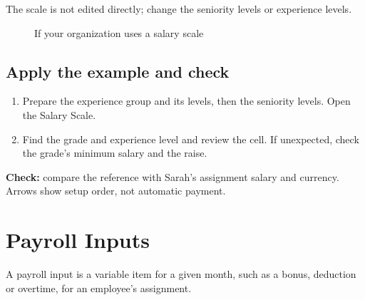 The scale is not edited directly; change the seniority levels or experience levels.

\begin{figure}[H]
\centering
{}
\rclegend
\caption{If your organization uses a salary scale}
\label{fig:hr-scale-setup}
\end{figure}

\subsection{Apply the example and check}

\begin{enumerate}
  \item Prepare the experience group and its levels, then the seniority levels. Open the Salary Scale.
  \item Find the grade and experience level and review the cell. If unexpected, check the grade's minimum salary and the raise.
\end{enumerate}

\textbf{Check:} compare the reference with Sarah's assignment salary and currency. Arrows show setup order, not automatic payment.

\clearpage
\section{Payroll Inputs}
\label{sec:hr-feature-payroll-inputs}

A payroll input is a variable item for a given month, such as a bonus, deduction or overtime, for an employee's assignment.

